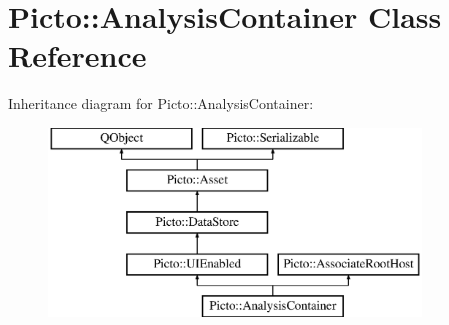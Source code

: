 \hypertarget{class_picto_1_1_analysis_container}{\section{Picto\-:\-:Analysis\-Container Class Reference}
\label{class_picto_1_1_analysis_container}
}
Inheritance diagram for Picto\-:\-:Analysis\-Container\-:\begin{figure}[H]
\begin{center}
\leavevmode
\includegraphics[height=5.000000cm]{class_picto_1_1_analysis_container}
\end{center}
\end{figure}
